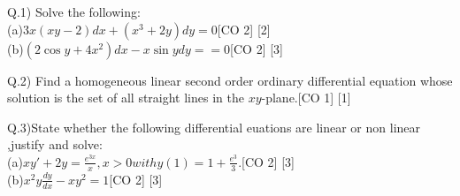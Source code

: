 \documentclass{article}
\author{Pratyay Prasad Dhond}
\begin{document}


\begin{flushleft}
Q.1) Solve the following:\\[10pt]
(a)$3x(xy-2)dx+(x^3+2y)dy=0$\hspace{5cm}[CO 2] [2]\\[6 pt]
(b)$(2\cos{y} + 4x^2)dx -x\sin{y}dy==0$\hspace{4.65cm}[CO 2]    [3]\\
\end{flushleft} 



\begin{flushleft}
 Q.2) Find a homogeneous linear second order ordinary differential equation whose solution is the set of all straight lines in the $xy$-plane.\hspace{1cm}[CO 1] [1]\\ 
\end{flushleft}

\begin{flushleft}
 Q.3)State whether the following differential euations are linear or non linear ,justify and solve:\\[10pt]
(a)$xy'+2y = \frac{e^{3x}}{x}, x>0 with y(1)=1+\frac{e^3}{3}. $\hspace{3.5cm}[CO 2] [3]\\[6 pt]
(b)$x^2y\frac{dy}{dx}- xy^2 = 1$\hspace{7.05cm}[CO 2] [3]
\end{flushleft}
\end{document}
